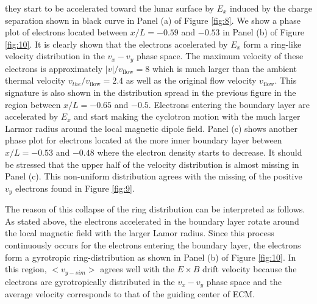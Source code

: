 \documentclass[draft,jgrga]{agutex2015}
\begin{document}
\begin{article}
they start to be accelerated toward the lunar surface 
by $E_x$ induced by the charge separation 
shown in black curve in Panel (a) of Figure \ref{fig:8}.
We show a phase plot of electrons located between 
$x/L = -0.59$ and $-0.53$ in Panel (b) of Figure \ref{fig:10}.
It is clearly shown that the electrons accelerated by $E_x$ form 
a ring-like velocity distribution in the $v_x-v_y$ phase space.
The maximum velocity of these electrons is approximately 
$|v|/v_\mathrm{flow} = 8$ which is much larger than 
the ambient thermal velocity $v_{the}/v_\mathrm{flow} = 2.4$ 
as well as the original flow velocity $v_\mathrm{flow}$.
This signature is also shown in the distribution spread in the previous figure
in the region between $x/L =-0.65$ and $-0.5$.
Electrons entering the boundary layer
are accelerated by $E_x$ and start making the cyclotron motion 
with the much larger Larmor radius 
around the local magnetic dipole field. 
Panel (c) shows another phase plot for electrons located at the more inner boundary
layer between $x/L = -0.53$ and $-0.48$ 
where the electron density starts to decrease.
It should be stressed that 
the upper half of the velocity distribution is almost missing in Panel (c).
This non-uniform distribution agrees with the missing of the positive $v_y$ 
electrons found in Figure \ref{fig:9}.

The reason of this collapse of the ring distribution can be interpreted 
as follows.
As stated above, the electrons accelerated in the boundary layer
rotate around the local magnetic field with the larger Lamor radius.
Since this process continuously occurs for the electrons 
entering the boundary layer,
the electrons form a gyrotropic ring-distribution
as shown in Panel (b) of Figure \ref{fig:10}.
In this region, 
$<v_{y-sim}>$ agrees well with the $E \times B$ drift velocity 
because the electrons are gyrotropically 
distributed in the $v_x-v_y$ phase space and the average velocity 
corresponds to that of the guiding center of ECM.

%  



\end{article}
\end{document}
